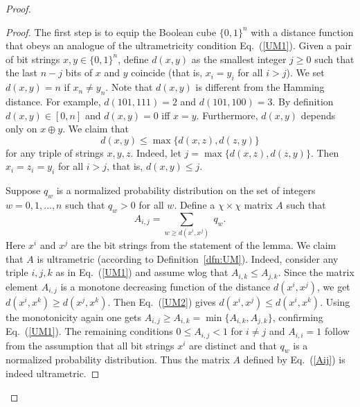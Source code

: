 \begin{proof}
\begin{proof}
The first step is to equip the Boolean cube $\{0,1\}^n$
with a distance function that obeys an analogue of the ultrametricity condition
Eq.~(\ref{UM1}).
Given a pair of bit strings $x,y\in \{0,1\}^n$,
define $d(x,y)$ as the smallest integer $j\ge 0$ such that 
the last $n-j$ bits of $x$ and $y$ coincide (that is, $x_i=y_i$ for all $i>j$).
We set $d(x,y)=n$ if $x_n\ne y_n$.
Note that $d(x,y)$ is different from the Hamming distance.
For example, $d(101,111)=2$ and $d(101,100)=3$.
By definition $d(x,y)\in [0,n]$ and $d(x,y)=0$ iff $x=y$. 
Furthermore, $d(x,y)$ depends only on $x\oplus y$.
We claim that
\begin{equation}
\label{UM2}
d(x,y)\le \max{\{ d(x,z),d(z,y)\}}
\end{equation}
for any triple of strings $x,y,z$. Indeed,
let $j=\max{\{ d(x,z),d(z,y)\}}$. Then
$x_i=z_i=y_i$ for all $i>j$, that is, 
$d(x,y)\le j$.

Suppose $q_w$ is a normalized probability distribution on the set of integers
$w=0,1,\ldots,n$ such that $q_w>0$ for all $w$. 
Define a $\chi\times \chi$ matrix $A$ such that 
\begin{equation}
\label{Aij}
A_{i,j}= \sum_{w\ge d(x^i,x^j)} \;  q_w.
\end{equation}
Here $x^i$ and $x^j$ are the bit strings from the statement of the lemma.
We claim that $A$ is ultrametric (according to Definition~\ref{dfn:UM}).
Indeed, consider any triple $i,j,k$ as in Eq.~(\ref{UM1}) and assume wlog that
$A_{i,k}\le A_{j,k}$. 
Since the matrix element $A_{i,j}$ is a monotone decreasing function
of the distance $d(x^i,x^j)$, we get $d(x^i,x^k)\ge d(x^j,x^k)$.
Then Eq.~(\ref{UM2}) gives $d(x^i,x^j)\le d(x^i,x^k)$.
Using the monotonicity again one gets $A_{i,j}\ge A_{i,k}=\min{\{A_{i,k},A_{j,k}\}}$,
confirming Eq.~(\ref{UM1}). 
The remaining conditions $0\le A_{i,j}<1$ for $i\ne j$ and $A_{i,i}=1$ follow from the 
assumption that all bit strings $x^i$ are distinct and that $q_w$ is a 
normalized probability distribution.
Thus the matrix $A$ defined by Eq.~(\ref{Aij}) is indeed ultrametric.


\end{proof}
\end{proof}
